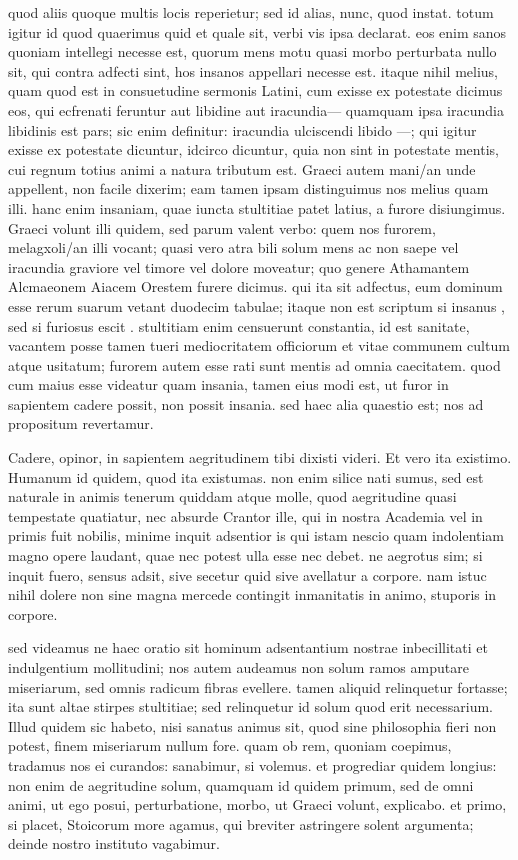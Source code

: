  quod aliis quoque multis locis reperietur; sed id alias, nunc, quod instat. totum igitur id quod quaerimus quid et quale sit, verbi vis ipsa declarat. eos enim sanos quoniam intellegi necesse est, quorum mens motu quasi morbo perturbata nullo sit, qui contra adfecti sint, hos insanos appellari necesse est. itaque nihil melius, quam quod est in consuetudine sermonis Latini, cum exisse ex potestate dicimus eos, qui ecfrenati feruntur aut libidine aut iracundia— quamquam ipsa iracundia libidinis est pars; sic enim definitur: iracundia ulciscendi libido —; qui igitur exisse ex potestate dicuntur, idcirco dicuntur, quia non sint in potestate mentis, cui regnum totius animi a natura tributum est. Graeci autem mani/an unde appellent, non facile dixerim; eam tamen ipsam distinguimus nos melius quam illi. hanc enim insaniam, quae iuncta stultitiae patet latius, a furore disiungimus. Graeci volunt illi quidem, sed parum valent verbo: quem nos furorem, melagxoli/an illi vocant; quasi vero atra bili solum mens ac non saepe vel iracundia graviore vel timore vel dolore moveatur; quo genere Athamantem Alcmaeonem Aiacem Orestem furere dicimus. qui ita sit adfectus, eum dominum esse rerum suarum vetant duodecim tabulae; itaque non est scriptum si insanus , sed si furiosus escit . stultitiam enim censuerunt constantia, id est sanitate, vacantem posse tamen tueri mediocritatem officiorum et vitae communem cultum atque usitatum; furorem autem esse rati sunt mentis ad omnia caecitatem. quod cum maius esse videatur quam insania, tamen eius modi est, ut furor in sapientem cadere possit, non possit insania. sed haec alia quaestio est; nos ad propositum revertamur.

 Cadere, opinor, in sapientem aegritudinem tibi dixisti videri. Et vero ita existimo. Humanum id quidem, quod ita existumas. non enim silice nati sumus, sed est naturale in animis tenerum quiddam atque molle, quod aegritudine quasi tempestate quatiatur, nec absurde Crantor ille, qui in nostra Academia vel in primis fuit nobilis, minime inquit adsentior is qui istam nescio quam indolentiam magno opere laudant, quae nec potest ulla esse nec debet. ne aegrotus sim; si inquit fuero, sensus adsit, sive secetur quid sive avellatur a corpore. nam istuc nihil dolere non sine magna mercede contingit inmanitatis in animo, stuporis in corpore.

 sed videamus ne haec oratio sit hominum adsentantium nostrae inbecillitati et indulgentium mollitudini; nos autem audeamus non solum ramos amputare miseriarum, sed omnis radicum fibras evellere. tamen aliquid relinquetur fortasse; ita sunt altae stirpes stultitiae; sed relinquetur id solum quod erit necessarium. Illud quidem sic habeto, nisi sanatus animus sit, quod sine philosophia fieri non potest, finem miseriarum nullum fore. quam ob rem, quoniam coepimus, tradamus nos ei curandos: sanabimur, si volemus. et progrediar quidem longius: non enim de aegritudine solum, quamquam id quidem primum, sed de omni animi, ut ego posui, perturbatione, morbo, ut Graeci volunt, explicabo. et primo, si placet, Stoicorum more agamus, qui breviter astringere solent argumenta; deinde nostro instituto vagabimur.

